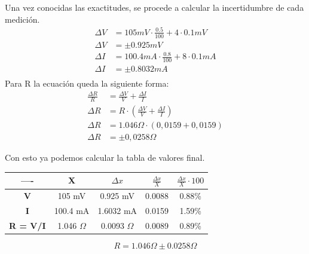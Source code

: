 Una vez conocidas las exactitudes, se procede a calcular la incertidumbre de cada medición.
\begin{equation*}
\begin{split}
    \Delta V &= 105mV \cdot \frac{0.5}{100} + 4 \cdot 0.1mV \\
    \Delta V &= \pm0.925mV \\
    \Delta I &= 100.4mA \cdot \frac{0.8}{100} + 8 \cdot 0.1mA \\
    \Delta I &= \pm0.8032mA \\
\end{split}
\end{equation*}
Para R la ecuación queda la siguiente forma:
\begin{equation*}
  \begin{split}
    \frac{\Delta R}{R} &= \frac{\Delta V}{V} + \frac{\Delta I}{I} \\
    \Delta R &= R \cdot \left(\frac{\Delta V}{V} + \frac{\Delta I}{I}\right) \\
    \Delta R &= 1.046\Omega \cdot \left(0,0159 + 0,0159\right) \\
    \Delta R &= \pm0,0258\Omega
  \end{split}
\end{equation*}

Con esto ya podemos calcular la tabla de valores final.

\begin{table}[h]
\centering
\renewcommand{\arraystretch}{1.8}
\begin{tabular}{|c|c|c|c|c|}
\hline
---- & X & $\Delta x$ & $\frac{\Delta x}{X}$ & $\frac{\Delta x}{X} \cdot 100$ \\ \hline
\textbf{V} & 105 mV & 0.925 mV & 0.0088 & 0.88\% \\ \hline
\textbf{I} & 100.4 mA & 1.6032 mA & 0.0159 & 1.59\% \\ \hline
\textbf{R = V/I} & 1.046 $\Omega$ & 0.0093 $\Omega$ & 0.0089 & 0.89\% \\ \hline
\end{tabular}
\end{table}
\begin{equation*}
  R = 1.046 \Omega \pm 0.0258 \Omega
\end{equation*}
